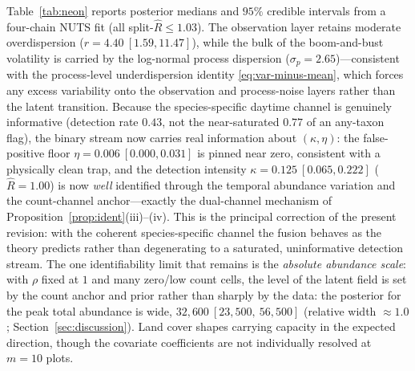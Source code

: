 \documentclass[preprint,12pt]{elsarticle}
\theoremstyle{definition}
\begin{document}
Table~\ref{tab:neon} reports posterior medians and $95\%$ credible intervals
from a four-chain NUTS fit (all split-$\widehat R\le1.03$). The observation layer
retains moderate overdispersion ($r=4.40\ [1.59,11.47]$), while the bulk of the
boom-and-bust volatility is carried by the log-normal process dispersion
($\sigma_p=2.65$)---consistent with the process-level underdispersion identity
\eqref{eq:var-minus-mean}, which forces any excess variability onto the
observation and process-noise layers rather than the latent transition.
Because the species-specific daytime channel is genuinely informative (detection
rate $0.43$, not the near-saturated $0.77$ of an any-taxon flag), the binary
stream now carries real information about $(\kappa,\eta)$: the false-positive
floor $\eta=0.006\ [0.000,0.031]$ is pinned near zero, consistent with a
physically clean trap, and the detection intensity
$\kappa=0.125\ [0.065,0.222]$ ($\widehat R=1.00$) is now \emph{well} identified
through the temporal abundance variation and the count-channel anchor---exactly the
dual-channel mechanism of Proposition~\ref{prop:ident}(iii)--(iv). This is the
principal correction of the present revision: with the coherent
species-specific channel the fusion behaves as the theory predicts rather than
degenerating to a saturated, uninformative detection stream. The one identifiability
limit that remains is the \emph{absolute abundance scale}: with $\rho$ fixed at
$1$ and many zero/low count cells, the level of the latent field is set by the
count anchor and prior rather than sharply by the data: the posterior for the
peak total abundance is wide, $32{,}600\ [23{,}500,\ 56{,}500]$ (relative width
$\approx1.0$; Section~\ref{sec:discussion}). Land cover shapes carrying
capacity in the expected direction, though the covariate coefficients are not
individually resolved at $m=10$ plots.
\end{document}

